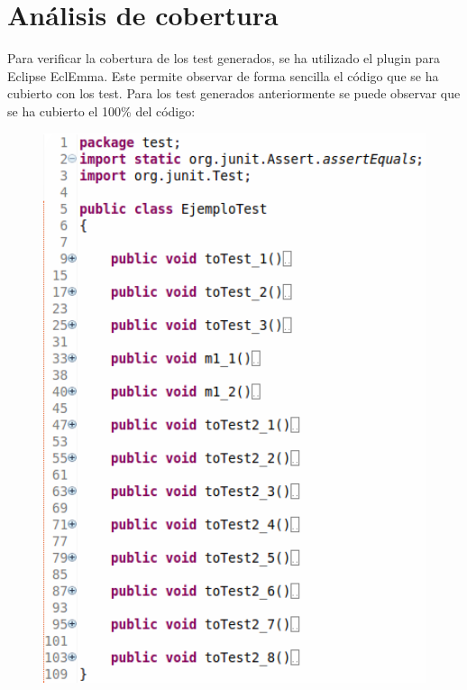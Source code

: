 \documentclass{llncs}
\begin{document}
    
\section{Análisis de cobertura}
Para verificar la cobertura de los test generados, se ha utilizado el plugin para Eclipse EclEmma. Este permite observar de forma sencilla el código que se ha cubierto
con los test. Para los test generados anteriormente se puede observar que se ha cubierto el 100\% del código:   
\begin{figure}[hbt!]
  \centering
  \begin{minipage}[H]{0.3\textwidth}
  \centering
  \includegraphics[width=1.7\textwidth]{screenshots/testGenerados}\\
\end{minipage}
\begin{minipage}[H]{0.55\textwidth}

\end{minipage}
\end{figure}
\end{document}
